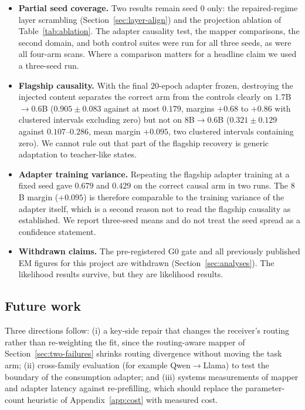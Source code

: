 \documentclass[11pt]{article}
\begin{document}
\begin{itemize}
  $0.6$B and $4$B failures are of the same kind. The $1.7$B dip is therefore
  task error, not a formatting or extraction artifact, but we still cannot
  explain why that size is the weakest. It does not affect within-pair arm
  comparisons, which is what our claims rest on, but it means absolute EM
  levels are not comparable across pairs.
\item \textbf{Partial seed coverage.} Two results remain seed 0 only: the
  repaired-regime layer scrambling (Section~\ref{sec:layer-align}) and the projection ablation of
  Table~\ref{tab:ablation}. The adapter causality test, the mapper comparisons,
  the second domain, and both control suites were run for all three seeds, as
  were all four-arm scans. Where a comparison matters for a headline claim we
  used a three-seed run.
\item \textbf{Flagship causality.} With the final $20$-epoch adapter frozen,
  destroying the injected content separates the correct arm from the
  controls clearly on $1.7$B$\to0.6$B ($0.905\pm0.083$ against at most $0.179$,
  margins $+0.68$ to $+0.86$ with clustered intervals excluding zero) but not on
  $8$B$\to0.6$B ($0.321\pm0.129$ against $0.107$--$0.286$, mean margin $+0.095$,
  two clustered intervals containing zero). We cannot rule out that part of the
  flagship recovery is generic adaptation to teacher-like states.
\item \textbf{Adapter training variance.} Repeating the flagship adapter
  training at a fixed seed gave $0.679$ and $0.429$ on the correct causal arm in
  two runs. The $8$B margin ($+0.095$) is therefore comparable to the training
  variance of the adapter itself, which is a second reason not to read the
  flagship causality as established. We report three-seed means and do not treat
  the seed spread as a confidence statement.
\item \textbf{Withdrawn claims.} The pre-registered G0 gate and all previously
  published EM figures for this project are withdrawn (Section~\ref{sec:analyses}). The
  likelihood results survive, but they are likelihood results.
\end{itemize}

\subsection{Future work}
\label{sec:future-work}
Three directions follow: (i) a key-side repair that changes the receiver's
routing rather than re-weighting the fit, since the routing-aware mapper of
Section~\ref{sec:two-failures} shrinks routing divergence without moving the task
arm; (ii) cross-family evaluation (for example Qwen$\to$Llama) to test the
boundary of the consumption adapter; and (iii) systems measurements of mapper and
adapter latency against re-prefilling, which should replace the parameter-count
heuristic of Appendix~\ref{app:cost} with measured cost.
\end{document}
